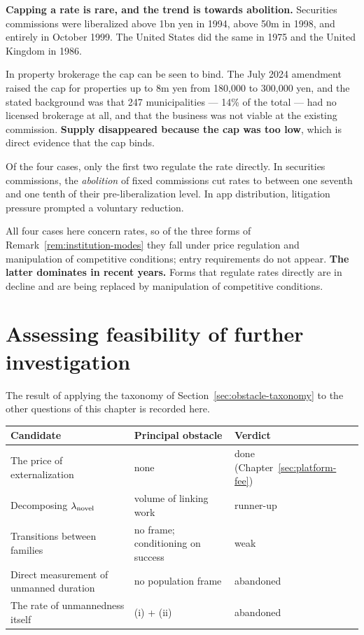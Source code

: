 \textbf{Capping a rate is rare, and the trend is towards abolition.} Securities commissions
were liberalized above 1bn yen in 1994, above 50m in 1998, and entirely in October 1999. The
United States did the same in 1975 and the United Kingdom in 1986.

In property brokerage the cap can be seen to bind. The July 2024 amendment raised the cap for
properties up to 8m yen from 180{,}000 to 300{,}000 yen, and the stated background was that
247 municipalities --- 14\% of the total --- had no licensed brokerage at all, and that the
business was not viable at the existing commission.
\textbf{Supply disappeared because the cap was too low}, which is direct evidence that the
cap binds.

\begin{remark}
\label{rem:institution-shift}
Of the four cases, only the first two regulate the rate directly. In securities commissions,
the \emph{abolition} of fixed commissions cut rates to between one seventh and one tenth of
their pre-liberalization level. In app distribution, litigation pressure prompted a voluntary
reduction.

All four cases here concern rates, so of the three forms of
Remark~\ref{rem:institution-modes} they fall under price regulation and manipulation of
competitive conditions; entry requirements do not appear.
\textbf{The latter dominates in recent years.} Forms that regulate rates directly are in
decline and are being replaced by manipulation of competitive conditions.
\end{remark}

\section{Assessing feasibility of further investigation}

The result of applying the taxonomy of Section~\ref{sec:obstacle-taxonomy} to the other
questions of this chapter is recorded here.

\begin{center}
\begin{tabularx}{\textwidth}{@{}lXl@{}}
\toprule
Candidate & Principal obstacle & Verdict \\
\midrule
The price of externalization & none & done (Chapter~\ref{sec:platform-fee}) \\
Decomposing $\lambda_{\rm novel}$ & volume of linking work & runner-up \\
Transitions between families & no frame; conditioning on success & weak \\
Direct measurement of unmanned duration & no population frame & abandoned \\
The rate of unmannedness itself & (i) + (ii) & abandoned \\
\bottomrule
\end{tabularx}
\label{tab:platformfee-obstacle-assignment}
\end{center}

